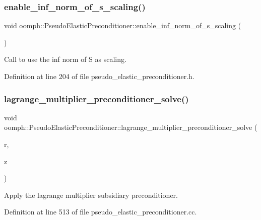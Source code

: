 \subsubsection{\texorpdfstring{enable\+\_\+inf\+\_\+norm\+\_\+of\+\_\+s\+\_\+scaling()}{enable\_inf\_norm\_of\_s\_scaling()}}
{\footnotesize\ttfamily void oomph\+::\+Pseudo\+Elastic\+Preconditioner\+::enable\+\_\+inf\+\_\+norm\+\_\+of\+\_\+s\+\_\+scaling (\begin{DoxyParamCaption}{ }\end{DoxyParamCaption})\hspace{0.3cm}{\ttfamily [inline]}}



Call to use the inf norm of S as scaling. 



Definition at line 204 of file pseudo\+\_\+elastic\+\_\+preconditioner.\+h.

\mbox{\label{classoomph_1_1PseudoElasticPreconditioner_a071ddbc46bb55f2c11fe0dfe9b69bb4a}} 
\subsubsection{\texorpdfstring{lagrange\+\_\+multiplier\+\_\+preconditioner\+\_\+solve()}{lagrange\_multiplier\_preconditioner\_solve()}}
{\footnotesize\ttfamily void oomph\+::\+Pseudo\+Elastic\+Preconditioner\+::lagrange\+\_\+multiplier\+\_\+preconditioner\+\_\+solve (\begin{DoxyParamCaption}\item[{const Double\+Vector \&}]{r,  }\item[{Double\+Vector \&}]{z }\end{DoxyParamCaption})\hspace{0.3cm}{\ttfamily [private]}}



Apply the lagrange multiplier subsidiary preconditioner. 



Definition at line 513 of file pseudo\+\_\+elastic\+\_\+preconditioner.\+cc.



